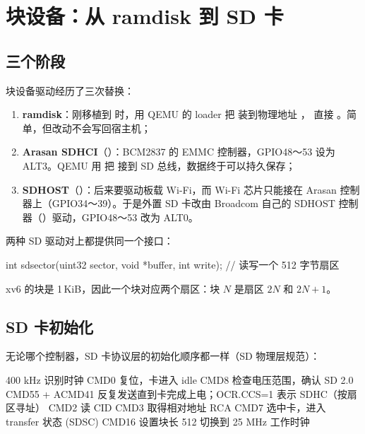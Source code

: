 \section{块设备：从 ramdisk 到 SD 卡}

\subsection{三个阶段}

块设备驱动经历了三次替换：

\begin{enumerate}
  \item \textbf{ramdisk}：刚移植到  时，用 QEMU 的 loader 把  装到物理地址 ， 直接 。简单，但改动不会写回宿主机；
  \item \textbf{Arasan SDHCI}（）：BCM2837 的 EMMC 控制器，GPIO48～53 设为 ALT3。QEMU 用  把  接到 SD 总线，数据终于可以持久保存；
  \item \textbf{SDHOST}（）：后来要驱动板载 Wi-Fi，而 Wi-Fi 芯片只能接在 Arasan 控制器上（GPIO34～39）。于是外置 SD 卡改由 Broadcom 自己的 SDHOST 控制器（）驱动，GPIO48～53 改为 ALT0。
\end{enumerate}

两种 SD 驱动对上都提供同一个接口：

\begin{ccode}
int sdsector(uint32 sector, void *buffer, int write);   // 读写一个 512 字节扇区
\end{ccode}

xv6 的块是 1\,KiB，因此一个块对应两个扇区：块 $N$ 是扇区 $2N$ 和 $2N+1$。

\subsection{SD 卡初始化}

无论哪个控制器，SD 卡协议层的初始化顺序都一样（SD 物理层规范\cite{sdspec}）：

\begin{txtcode}
400 kHz 识别时钟
CMD0                复位，卡进入 idle
CMD8                检查电压范围，确认 SD 2.0
CMD55 + ACMD41      反复发送直到卡完成上电；OCR.CCS=1 表示 SDHC（按扇区寻址）
CMD2                读 CID
CMD3                取得相对地址 RCA
CMD7                选中卡，进入 transfer 状态
(SDSC) CMD16        设置块长 512
切换到 25 MHz 工作时钟
\end{txtcode}

